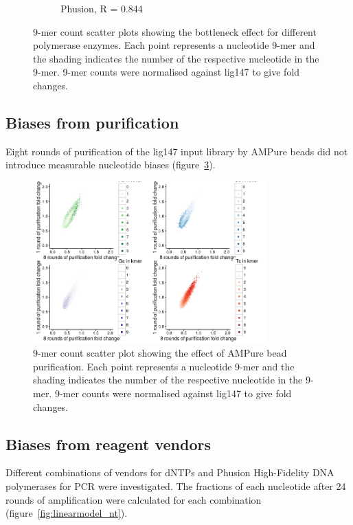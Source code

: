 \documentclass[parskip=full, numbers=noenddot]{scrreprt}
\begin{document}
\begin{figure}[htb]
\begin{subfigure}[htb]{0.5\textwidth}
    \caption{Phusion, R = 0.844}
    \label{fig:kmer_bn_phusion}
  \end{subfigure}
  \caption{9-mer count scatter plots showing the bottleneck effect for different polymerase enzymes.  Each point represents a nucleotide 9-mer and the shading indicates the number of the respective nucleotide in the 9-mer.  9-mer counts were normalised against lig147 to give fold changes.}
  \label{fig:kmer_bn}
\end{figure}

\subsection{Biases from purification}
\label{ssec:pcrbias_result_pur}

Eight rounds of purification of the lig147 input library by AMPure beads did not introduce measurable nucleotide biases (figure~\ref{fig:kmer_pur}).

\begin{figure}[h]
  \centering
  \includegraphics[width=0.8\textwidth]{kmer_ampure}
  \caption{9-mer count scatter plot showing the effect of AMPure bead purification.  Each point represents a nucleotide 9-mer and the shading indicates the number of the respective nucleotide in the 9-mer.  9-mer counts were normalised against lig147 to give fold changes.}
  \label{fig:kmer_pur}
\end{figure}

\subsection{Biases from reagent vendors}
\label{ssec:pcrbias_result_reagent}

Different combinations of vendors for dNTPs and Phusion High-Fidelity DNA polymerases for PCR were investigated.  The fractions of each nucleotide after 24 rounds of amplification were calculated for each combination (figure~\ref{fig:linearmodel_nt}).
\end{document}
